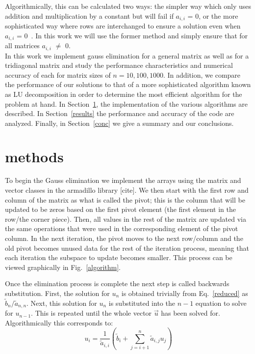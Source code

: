 \documentclass[prc,amsmath,twocolumn,superscriptaddress]{revtex4}
\begin{document}
Algorithmically, this can be calculated two ways: the simpler way which only uses addition and multiplication by a constant but will fail if $a_{i,i}$ = 0, or the more sophisticated way where rows are interchanged to ensure a solution even when $a_{i,i}$ = 0~\cite{book}. In this work we will use the former method and simply ensure that for all matrices $a_{i,i}$ $\neq$ 0. \\

In this work we implement gauss elimination for a general matrix as well as for a tridiagonal matrix and study the performance characteristics and numerical accuracy of each for matrix sizes of $n=10,100,1000$. In addition, we compare the performance of our solutions to that of a more sophisticated algorithm known as LU decomposition in order to determine the most efficient algorithm for the problem at hand. In Section~\ref{methods}, the implementation of the various algorithms are described. In Section~\ref{results} the performance and accuracy of the code are analyzed. Finally, in Section~\ref{conc} we give a summary and our conclusions.

\section{methods}
\label{methods}
To begin the Gauss elimination we implement the arrays using the matrix and vector classes in the armadillo library [cite]. We then start with the first row and column of the matrix as what is called the pivot; this is the column that will be updated to be zeros based on the first pivot element (the first element in the row/the corner piece). Then, all values in the rest of the matrix are updated via the same operations that were used in the corresponding element of the pivot column. In the next iteration, the pivot moves to the next row/column and the old pivot becomes unused data for the rest of the iteration process, meaning that each iteration the subspace to update becomes smaller. This process can be viewed graphically in Fig.~\ref{algorithm}.

Once the elimination process is complete the next step is called backwards substitution. First, the solution for $u_n$ is obtained trivially from Eq.~\ref{reduced} as $\tilde{b}_n/\tilde{a}_{n,n}$. Next, this solution for $u_n$ is substituted into the $n-1$ equation to solve for $u_{n-1}$. This is repeated until the whole vector $\vec{u}$ has been solved for. Algorithmically this corresponds to:
\begin{equation}
u_i=\frac{1}{\tilde{a}_{i,i}}\left(\tilde{b}_i + \sum_{j=i+1}^n \tilde{a}_{i,j}u_j \right)
\end{equation}
\end{document}
